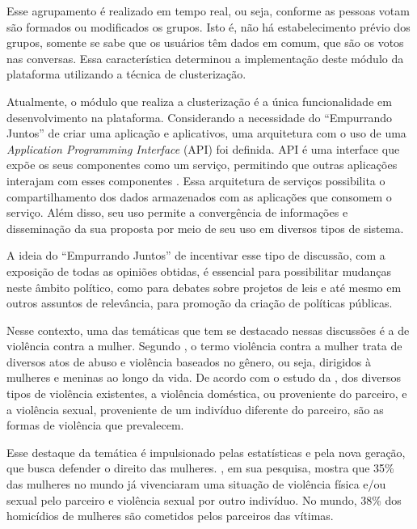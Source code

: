 Esse agrupamento é realizado em tempo real, ou seja, conforme as pessoas votam são formados ou modificados os grupos. 
Isto é, não há estabelecimento prévio dos grupos, somente se sabe que os usuários têm dados em comum, que são os votos nas conversas. Essa característica determinou a implementação deste módulo da plataforma utilizando a técnica de clusterização.

Atualmente, o módulo que realiza a clusterização é a única funcionalidade em desenvolvimento na plataforma. Considerando a necessidade do
``Empurrando Juntos'' de criar uma aplicação e aplicativos, uma arquitetura com o uso de uma \textit{Application Programming Interface} (API) foi
definida. API é uma interface que expõe os seus componentes como um serviço, permitindo que outras aplicações interajam com esses 
componentes \cite{wagh2012comparative, understanding_web}. Essa arquitetura de serviços possibilita o compartilhamento dos dados 
armazenados com as aplicações que consomem o serviço. Além disso, 
seu uso permite a convergência de informações e disseminação da sua proposta por meio de seu uso em diversos tipos de sistema.

A ideia do ``Empurrando Juntos'' de incentivar esse tipo de discussão, com a exposição de todas as opiniões obtidas, é essencial para possibilitar mudanças neste âmbito político, como
para debates sobre projetos de leis e até mesmo em outros assuntos de relevância, para promoção da criação de políticas públicas.

Nesse contexto, uma das temáticas que tem se destacado nessas discussões é a de violência contra a mulher. Segundo , 
o termo violência contra a mulher trata de
diversos atos de abuso e violência baseados no gênero, ou seja, dirigidos à mulheres e meninas ao longo da vida.
De acordo com o estudo da , dos diversos tipos de violência existentes, a violência doméstica, ou proveniente do parceiro,
e a violência sexual, proveniente de um indivíduo diferente do parceiro, são as formas de violência que prevalecem.

Esse destaque da temática é impulsionado pelas estatísticas e pela nova geração, que busca defender o direito das mulheres. , em sua pesquisa, mostra que 
35\% das mulheres no mundo já vivenciaram 
uma situação de violência física e/ou sexual pelo parceiro e violência sexual por outro indivíduo. No mundo, 38\% dos homicídios de mulheres são cometidos 
pelos parceiros das vítimas.

